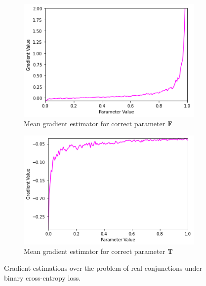 \begin{figure}[H]
\begin{subfigure}[b]{0.47\textwidth}
    \end{subfigure}
    \begin{subfigure}[b]{0.47\textwidth}
        \centering
        \includegraphics[width=\textwidth]{imgs/grad_prod_bce_falseparam_10dim_avg.png}
        \caption{Mean gradient estimator for correct parameter $\textbf{F}$}
        \label{fig:conjgrad1falseavgbce}
    \end{subfigure}
    \begin{subfigure}[b]{0.47\textwidth}
        \centering
        \includegraphics[width=\textwidth]{imgs/grad_prod_bce_trueparam_10dim_avg.png}
        \caption{Mean gradient estimator for correct parameter $\textbf{T}$}
        \label{fig:conjgrad1trueavgbce}
    \end{subfigure}
       \caption{Gradient estimations over the problem of real conjunctions under binary cross-entropy loss.}
       \label{fig:conjgrad1bce}
\end{figure}

